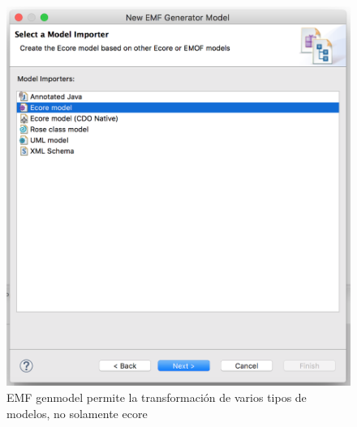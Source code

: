 \begin{figure}
    \centering
    \includegraphics[scale=0.4]{images/emf_capturas/genmodel_4.png}
    \sourcepropia{}
    \caption[Genmodel desde otros tipos de modelado]{EMF genmodel permite la transformación de varios tipos de modelos, no solamente \gls{ecore}}
    \label{fig:modelo_genmodel_paso4}
\end{figure}
